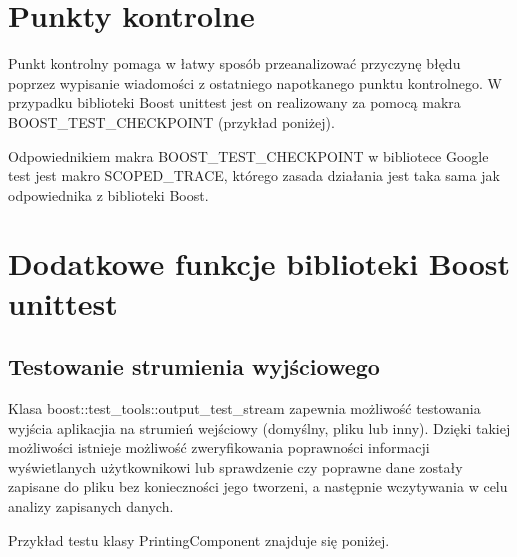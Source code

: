 \documentclass[12pt,a4paper,notitlepage]{report}
\begin{document}
\chapter{Punkty kontrolne}

Punkt kontrolny pomaga w łatwy sposób przeanalizować przyczynę błędu poprzez wypisanie wiadomości z ostatniego napotkanego punktu kontrolnego. W przypadku biblioteki Boost unittest jest on realizowany za pomocą makra BOOST{\_}TEST{\_}CHECKPOINT (przykład poniżej).

			

Odpowiednikiem makra BOOST{\_}TEST{\_}CHECKPOINT w bibliotece Google test jest makro SCOPED{\_}TRACE, którego zasada działania jest taka sama jak odpowiednika z biblioteki Boost.

			

\chapter{Dodatkowe funkcje biblioteki Boost unittest}

\section{Testowanie strumienia wyjściowego}

Klasa boost::test{\_}tools::output{\_}test{\_}stream zapewnia możliwość testowania wyjścia aplikacjia na strumień wejściowy (domyślny, pliku lub inny). Dzięki takiej możliwości istnieje możliwość zweryfikowania poprawności informacji wyświetlanych użytkownikowi lub sprawdzenie czy poprawne dane zostały zapisane do pliku bez konieczności jego tworzeni, a następnie wczytywania w celu analizy zapisanych danych.

Przykład testu klasy PrintingComponent znajduje się poniżej.

			
\end{document}
